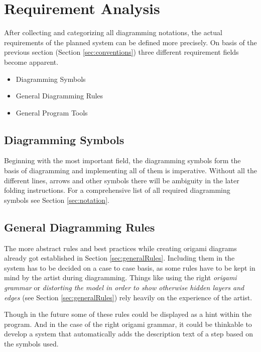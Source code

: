 
\section{Requirement Analysis}
\label{sec:requirementAnalysis}

After collecting and categorizing all diagramming notations, the actual requirements of the planned system can be defined more precisely. On basis of the previous section (Section \ref{sec:conventions}) three different requirement fields become apparent.

\begin{itemize}
	\item Diagramming Symbols
	\item General Diagramming Rules
	\item General Program Tools
\end{itemize}

\subsection{Diagramming Symbols}

Beginning with the most important field, the diagramming symbols form the basis of diagramming and implementing all of them is imperative. Without all the different lines, arrows and other symbols there will be ambiguity in the later folding instructions. For a comprehensive list of all required diagramming symbols see Section \ref{sec:notation}.

\subsection{General Diagramming Rules}

The more abstract rules and best practices while creating origami diagrams already got established in Section \ref{sec:generalRules}. Including them in the system has to be decided on a case to case basis, as some rules have to be kept in mind by the artist during diagramming. Things like using the right \emph{origami grammar} or \emph{distorting the model in order to show otherwise hidden layers and edges} (see Section \ref{sec:generalRules}) rely heavily on the experience of the artist.

Though in the future some of these rules could be displayed as a hint within the program. And in the case of the right origami grammar, it could be thinkable to develop a system that automatically adds the description text of a step based on the symbols used.

